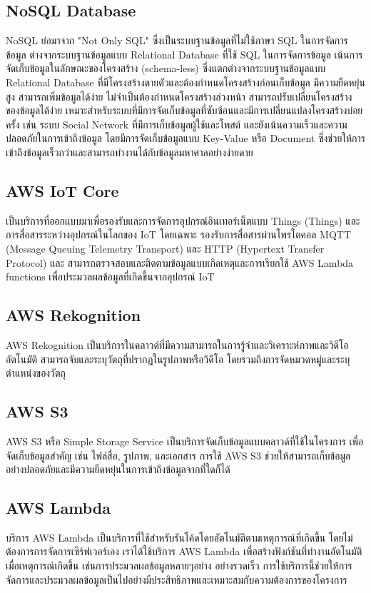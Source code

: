 \subsection{NoSQL Database}
NoSQL ย่อมาจาก "Not Only SQL" ซึ่งเป็นระบบฐานข้อมูลที่ไม่ใช้ภาษา SQL ในการจัดการข้อมูล ต่างจากระบบฐานข้อมูลแบบ Relational Database ที่ใช้ SQL ในการจัดการข้อมูล
เน้นการจัดเก็บข้อมูลในลักษณะของโครงสร้าง (schema-less) ซึ่งแตกต่างจากระบบฐานข้อมูลแบบ Relational Database ที่มีโครงสร้างตายตัวและต้องกำหนดโครงสร้างก่อนเก็บข้อมูล
มีความยืดหยุ่นสูง สามารถเพิ่มข้อมูลได้ง่าย ไม่จำเป็นต้องกำหนดโครงสร้างล่วงหน้า สามารถปรับเปลี่ยนโครงสร้างของข้อมูลได้ง่าย เหมาะสำหรับระบบที่มีการจัดเก็บข้อมูลที่ซับซ้อนและมีการเปลี่ยนแปลงโครงสร้างบ่อยครั้ง เช่น ระบบ Social Network ที่มีการเก็บข้อมูลผู้ใช้และโพสต์
และยังเน้นความเร็วและความปลอดภัยในการเข้าถึงข้อมูล โดยมีการจัดเก็บข้อมูลแบบ Key-Value หรือ Document ซึ่งช่วยให้การเข้าถึงข้อมูลเร็วกว่าและสามารถทำงานได้กับข้อมูลมหาศาลอย่างง่ายดาย\cite{NoSQL}

\subsection{AWS IoT Core}
เป็นบริการที่ออกแบบมาเพื่อรองรับและการจัดการอุปกรณ์อินเทอร์เน็ตแบบ Things (Things) และการสื่อสารระหว่างอุปกรณ์ในโลกของ IoT โดยเฉพาะ รองรับการสื่อสารผ่านโพรโตคอล MQTT (Message Queuing Telemetry Transport) และ HTTP (Hypertext Transfer Protocol) 
และ สามารถตรวจสอบและติดตามข้อมูลแบบเกิดเหตุและการเรียกใช้ AWS Lambda functions เพื่อประมวลผลข้อมูลที่เกิดขึ้นจากอุปกรณ์ IoT \cite{AWS}

\subsection{AWS Rekognition}
AWS Rekognition เป็นบริการในคลาวด์ที่มีความสามารถในการรู้จำและวิเคราะห์ภาพและวิดีโออัตโนมัติ สามารถจับและระบุวัตถุที่ปรากฏในรูปภาพหรือวิดีโอ โดยรวมถึงการจัดหมวดหมู่และระบุตำแหน่งของวัตถุ\cite{AWS}

\subsection{AWS S3}
AWS S3 หรือ Simple Storage Service เป็นบริการจัดเก็บข้อมูลแบบคลาวด์ที่ใช้ในโครงการ เพื่อจัดเก็บข้อมูลสำคัญ เช่น ไฟล์สื่อ, รูปภาพ, และเอกสาร การใช้ AWS S3 ช่วยให้สามารถเก็บข้อมูลอย่างปลอดภัยและมีความยืดหยุ่นในการเข้าถึงข้อมูลจากที่ใดก็ได้
\cite{AWS}
\subsection{AWS Lambda}
บริการ AWS Lambda เป็นบริการที่ใช้สำหรับรันโค้ดโดยอัตโนมัติตามเหตุการณ์ที่เกิดขึ้น โดยไม่ต้องการการจัดการเซิร์ฟเวอร์เอง เราได้ใช้บริการ AWS Lambda เพื่อสร้างฟังก์ชันที่ทำงานอัตโนมัติเมื่อเหตุการณ์เกิดขึ้น เช่นการประมวลผลข้อมูลหลายๆอย่าง อย่างรวดเร็ว การใช้บริการนี้ช่วยให้การจัดการและประมวลผลข้อมูลเป็นไปอย่างมีประสิทธิภาพและเหมาะสมกับความต้องการของโครงการ
\cite{AWS}

